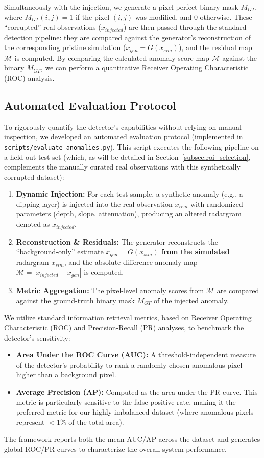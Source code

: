 Simultaneously with the injection, we generate a pixel-perfect binary mask $M_{GT}$, where $M_{GT}(i,j)=1$ if the pixel $(i,j)$ was modified, and 0 otherwise.
These \enquote{corrupted} real observations ($x_{injected}$) are then passed through the standard detection pipeline: they are compared against the generator's reconstruction of the corresponding pristine simulation ($x_{gen} = G(x_{sim})$), and the residual map $\mathcal{M}$ is computed.
By comparing the calculated anomaly score map $\mathcal{M}$ against the binary $M_{GT}$, we can perform a quantitative Receiver Operating Characteristic (ROC) analysis.

\subsection{Automated Evaluation Protocol}
\label{subsec:auto_eval_protocol}
To rigorously quantify the detector's capabilities without relying on manual inspection, we developed an automated evaluation protocol (implemented in \texttt{scripts/evaluate\_anomalies.py}).
This script executes the following pipeline on a held-out test set (which, as will be detailed in Section~\ref{subsec:roi_selection}, complements the manually curated real observations with this synthetically corrupted dataset):

\begin{enumerate}
    \item \textbf{Dynamic Injection:} For each test sample, a synthetic anomaly (e.g., a dipping layer) is injected into the real observation $x_{real}$ with randomized parameters (depth, slope, attenuation), producing an altered radargram denoted as $x_{injected}$.
    \item \textbf{Reconstruction \& Residuals:} The generator reconstructs the \enquote{background-only} estimate $x_{gen} = G(x_{sim})$ \textbf{from the simulated} radargram $x_{sim}$, and the absolute difference anomaly map $\mathcal{M} = | x_{injected} - x_{gen} |$ is computed.
    \item \textbf{Metric Aggregation:} The pixel-level anomaly scores from $\mathcal{M}$ are compared against the ground-truth binary mask $M_{GT}$ of the injected anomaly.
\end{enumerate}

We utilize standard information retrieval metrics, based on Receiver Operating Characteristic (ROC) and Precision-Recall (PR) analyses, to benchmark the detector's sensitivity:
\begin{itemize}
    \item \textbf{Area Under the ROC Curve (AUC):} A threshold-independent measure of the detector's probability to rank a randomly chosen anomalous pixel higher than a background pixel.
    \item \textbf{Average Precision (AP):} Computed as the area under the PR curve. This metric is particularly sensitive to the false positive rate, making it the preferred metric for our highly imbalanced dataset (where anomalous pixels represent $<1\%$ of the total area).
\end{itemize}

The framework reports both the mean AUC/AP across the dataset and generates global ROC/PR curves to characterize the overall system performance.

